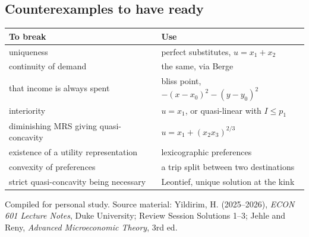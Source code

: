 \documentclass[11pt]{article}
\theoremstyle{definition}
\begin{document}
\subsection{Counterexamples to have ready}

\begin{center}
\begin{tabular}{@{}p{5.4cm}p{9.0cm}@{}}
\toprule
\textbf{To break} & \textbf{Use} \\
\midrule
uniqueness & perfect substitutes, $u=x_1+x_2$ \\
continuity of demand & the same, via Berge \\
that income is always spent & bliss point, $-(x-x_0)^2-(y-y_0)^2$ \\
interiority & $u=x_1$, or quasi-linear with $I\le p_1$ \\
diminishing MRS giving quasi-concavity & $u=x_1+(x_2x_3)^{2/3}$ \\
existence of a utility representation & lexicographic preferences \\
convexity of preferences & a trip split between two destinations \\
strict quasi-concavity being necessary & Leontief, unique solution at the kink \\
\bottomrule
\end{tabular}
\end{center}

\vfill
\begin{center}
{\footnotesize Compiled for personal study. Source material: Yildirim, H. (2025--2026),
\textit{ECON 601 Lecture Notes}, Duke University; Review Session Solutions 1--3; Jehle and
Reny, \textit{Advanced Microeconomic Theory}, 3rd ed.}
\end{center}
\end{document}
